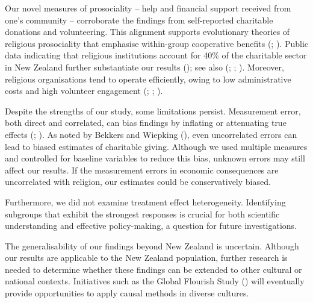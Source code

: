 \documentclass[
  single column]{article}
\begin{document}
Our novel measures of prosociality -- help and financial support
received from one's community -- corroborate the findings from
self-reported charitable donations and volunteering. This alignment
supports evolutionary theories of religious prosociality that emphasise
within-group cooperative benefits
(;
). Public
data indicating that religious institutions account for 40\% of the
charitable sector in New Zealand further substantiate our results
(); see also
(;
;
). Moreover,
religious organisations tend to operate efficiently, owing to low
administrative costs and high volunteer engagement
(;
;
).

Despite the strengths of our study, some limitations persist.
Measurement error, both direct and correlated, can bias findings by
inflating or attenuating true effects
(;
).
As noted by Bekkers and Wiepking
(), even uncorrelated errors
can lead to biased estimates of charitable giving. Although we used
multiple measures and controlled for baseline variables to reduce this
bias, unknown errors may still affect our results. If the measurement
errors in economic consequences are uncorrelated with religion, our
estimates could be conservatively biased.

Furthermore, we did not examine treatment effect heterogeneity.
Identifying subgroups that exhibit the strongest responses is crucial
for both scientific understanding and effective policy-making, a
question for future investigations.

The generalisability of our findings beyond New Zealand is uncertain.
Although our results are applicable to the New Zealand population,
further research is needed to determine whether these findings can be
extended to other cultural or national contexts. Initiatives such as the
Global Flourish Study () will eventually provide opportunities to apply causal
methods in diverse cultures.
\end{document}
